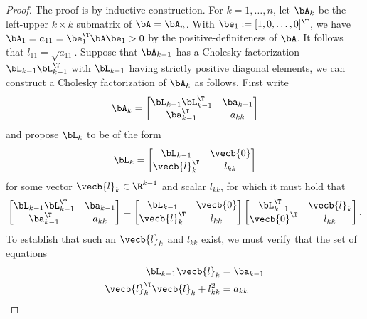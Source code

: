\begin{proof}
	The proof is by inductive construction. For $k = 1, \dots, n$, let $\bA_k$ be the left-upper $k \times k$ submatrix of $\bA = \bA_n$. With $\be_1 := [1, 0, \dots, 0]^\T$, we have $\bA_1 = a_{11} = \be_1^\T \bA \be_1 > 0$ by the positive-definiteness of $\bA$. It follows that $l_{11} = \sqrt{a_{11}}$. Suppose that $\bA_{k-1}$ has a Cholesky factorization $\bL_{k-1}\bL_{k-1}^\T$ with $\bL_{k-1}$ having strictly positive diagonal elements, we can construct a Cholesky factorization of $\bA_k$ as follows. First write
	\begin{equation}
		\label{MatrixAkBlock}
		\bA_k = \begin{bmatrix} \bL_{k-1}\bL_{k-1}^\T & \ba_{k-1} \\ \ba_{k-1}^\T & a_{kk} \end{bmatrix}
	\end{equation}
	and propose $\bL_k$ to be of the form
	\begin{equation}
		\label{MatrixLkBlock}
		\bL_k = \begin{bmatrix} \bL_{k-1} & \vecb{0} \\ \vecb{l}_k^\T & l_{kk} \end{bmatrix}
	\end{equation}
	for some vector $\vecb{l}_k \in \R^{k-1}$ and scalar $l_{kk}$, for which it must hold that
	\begin{equation}
		\label{MatrixBlockMultiplication}
		\begin{bmatrix} \bL_{k-1}\bL_{k-1}^\T & \ba_{k-1} \\ \ba_{k-1}^\T & a_{kk} \end{bmatrix} = \begin{bmatrix} \bL_{k-1} & \vecb{0} \\ \vecb{l}_k^\T & l_{kk} \end{bmatrix} \begin{bmatrix} \bL_{k-1}^\T & \vecb{l}_k \\ \vecb{0}^\T & l_{kk} \end{bmatrix}.
	\end{equation}
	To establish that such an $\vecb{l}_k$ and $l_{kk}$ exist, we must verify that the set of equations
	\begin{equation}
		\label{CholeskyEquationSystem}
		\begin{aligned}
			\bL_{k-1} \vecb{l}_k                & = \ba_{k-1} \\
			\vecb{l}_k^\T \vecb{l}_k + l_{kk}^2 & = a_{kk}
		\end{aligned}

\end{equation}
\end{proof}
